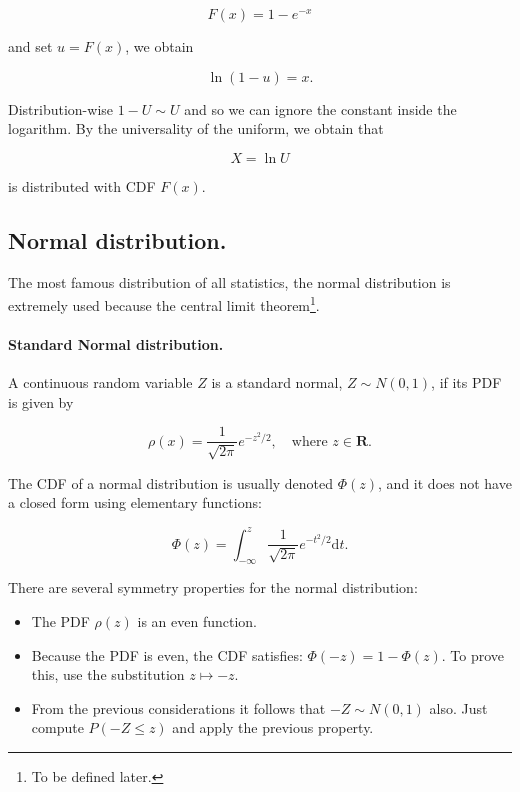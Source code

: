 \documentclass[12pt]{article}
\begin{document}
\begin{equation}
F(x) = 1 - e^{- x}
\end{equation}

\noindent
and set $u = F(x)$, we obtain

\begin{equation}
\ln \left( 1 - u \right) = x.
\end{equation}

\noindent
Distribution-wise $1 - U \sim U$ and so we can ignore the constant inside the logarithm.
By the universality of the uniform, we obtain that

\begin{equation}
X = \ln U
\end{equation}

\noindent
is distributed with CDF $F(x)$.

\subsection{Normal distribution.}

The most famous distribution of all statistics, the normal distribution is extremely used
because the central limit theorem\footnote{To be defined later.}.

\paragraph{Standard Normal distribution.}
A continuous random variable $Z$ is a standard normal, $Z \sim N(0,1)$, if
its PDF is given by

\begin{equation}
\rho(x) = \frac{1}{\sqrt{2 \pi}} e^{-z^{2}/2}, 
\quad
\text{where }
z \in \mathbf{R}.
\end{equation}

\noindent
The CDF of a normal distribution is usually denoted $\Phi (z)$, and it does not 
have a closed form using elementary functions:

\begin{equation}
\Phi(z) = \int_{-\infty}^{z} \frac{1}{\sqrt{2 \pi}} e^{-t^{2}/2} \mathrm{d} t.
\end{equation}

\noindent
There are several symmetry properties for the normal distribution:

\begin{itemize}
\item The PDF $\rho(z)$ is an even function.
\item Because the PDF is even, the CDF satisfies: $\Phi(-z) = 1 - \Phi(z)$.
To prove this, use the substitution $z \mapsto -z$.
\item From the previous considerations it follows that $-Z \sim N(0,1)$ also.
Just compute $P(-Z \leq z)$ and apply the previous property.
\end{itemize}
\end{document}
